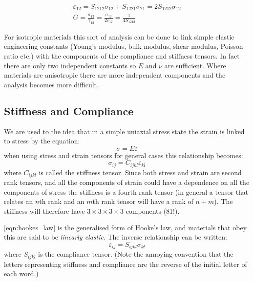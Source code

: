 \begin{align}
\varepsilon_{12} = S_{1212}\sigma_{12} + S_{1221}\sigma_{21} = 2 S_{1212}\sigma_{12}\nonumber \\
 G = \frac{\sigma_{12}}{\gamma_{12}} = \frac{\sigma_{12}}{2\varepsilon_{12}} = \frac{1}{4S_{1212}}
\end{align}

For isotropic materials this sort of analysis can be done to link simple elastic engineering constants (Young's modulus, bulk modulus, shear modulus, Poisson ratio etc.) with the components of the compliance and stiffness tensors. In fact there are only two independent constants so $E$ and $\nu$ are sufficient. Where materials are anisotropic there are more independent components and the analysis becomes more difficult.



\subsection{Stiffness and Compliance}

We are used to the idea that in a simple uniaxial stress state the strain is linked to stress by the equation:
\begin{equation}
\sigma = E \varepsilon
\end{equation}
when using stress and strain tensors for general cases this relationship becomes:
\begin{equation}
\sigma_{ij} = C_{ijkl}\varepsilon_{kl} \label{eqn:hookes_law}
\end{equation}
where $C_{ijkl}$ is called the stiffness tensor. Since both stress and strain are second rank tensors, and all the components of strain could have a dependence on all the components of stress the stiffness is a fourth rank tensor (in general a tensor that relates an $n$th rank and an $m$th rank tensor will have a rank of $n+m$). The stiffness will therefore have $3\times3\times3\times3$ components (81!).  

\autoref{eqn:hookes_law} is the generalised form of Hooke's law, and materials that obey this are said to be \emph{linearly elastic}. The inverse relationship can be written:
\begin{equation}
\varepsilon_{ij} = S_{ijkl} \sigma_{kl}
\end{equation}
where $S_{ijkl}$ is the compliance tensor. (Note the annoying convention that the letters representing stiffness and compliance are the reverse of the initial letter of each word.)

